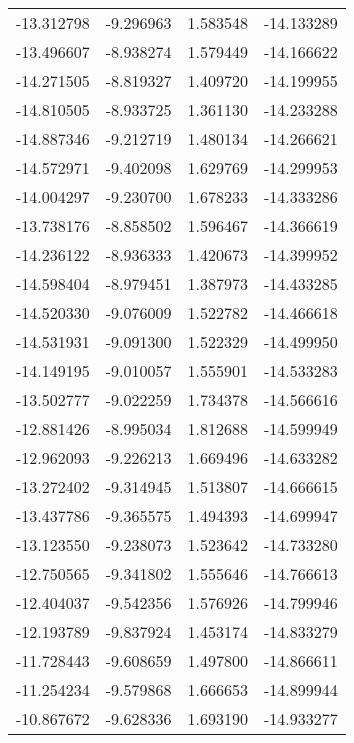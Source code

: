 \begin{tabular}{rrrr}
      -13.312798 &        -9.296963 &    1.583548 & -14.133289 \\
      -13.496607 &        -8.938274 &    1.579449 & -14.166622 \\
      -14.271505 &        -8.819327 &    1.409720 & -14.199955 \\
      -14.810505 &        -8.933725 &    1.361130 & -14.233288 \\
      -14.887346 &        -9.212719 &    1.480134 & -14.266621 \\
      -14.572971 &        -9.402098 &    1.629769 & -14.299953 \\
      -14.004297 &        -9.230700 &    1.678233 & -14.333286 \\
      -13.738176 &        -8.858502 &    1.596467 & -14.366619 \\
      -14.236122 &        -8.936333 &    1.420673 & -14.399952 \\
      -14.598404 &        -8.979451 &    1.387973 & -14.433285 \\
      -14.520330 &        -9.076009 &    1.522782 & -14.466618 \\
      -14.531931 &        -9.091300 &    1.522329 & -14.499950 \\
      -14.149195 &        -9.010057 &    1.555901 & -14.533283 \\
      -13.502777 &        -9.022259 &    1.734378 & -14.566616 \\
      -12.881426 &        -8.995034 &    1.812688 & -14.599949 \\
      -12.962093 &        -9.226213 &    1.669496 & -14.633282 \\
      -13.272402 &        -9.314945 &    1.513807 & -14.666615 \\
      -13.437786 &        -9.365575 &    1.494393 & -14.699947 \\
      -13.123550 &        -9.238073 &    1.523642 & -14.733280 \\
      -12.750565 &        -9.341802 &    1.555646 & -14.766613 \\
      -12.404037 &        -9.542356 &    1.576926 & -14.799946 \\
      -12.193789 &        -9.837924 &    1.453174 & -14.833279 \\
      -11.728443 &        -9.608659 &    1.497800 & -14.866611 \\
      -11.254234 &        -9.579868 &    1.666653 & -14.899944 \\
      -10.867672 &        -9.628336 &    1.693190 & -14.933277 \\

\end{tabular}
